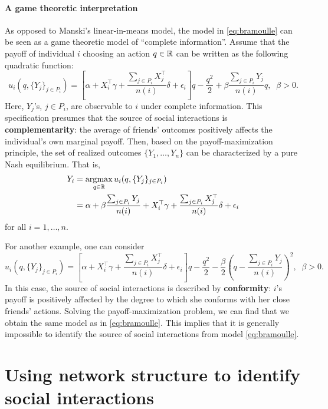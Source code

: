 \documentclass[11pt, A4paper, openany, uplatex]{book}
\begin{document}
\paragraph{A game theoretic interpretation}

As opposed to Manski's linear-in-means model,  the model in \eqref{eq:bramoulle} can be seen as a game theoretic model of ``complete information''.
Assume that the payoff of individual $i$ choosing an action $q \in \mathbb{R}$ can be written as the following quadratic function:
\begin{equation*}
u_i(q, \{Y_j\}_{j \in P_i})=\left[ \alpha + X_i^\top \gamma +  \frac{\sum_{j \in P_i} X_j^\top}{n(i)} \delta + \epsilon_i  \right] q -\frac{q^{2}}{2} + \beta \frac{\sum_{j \in P_i} Y_j}{n(i)} q, \;\; \beta > 0.
\end{equation*}
Here, $Y_j$'s, $j \in P_i$, are observable to $i$ under complete information. 
This specification presumes that the source of social interactions is \textbf{complementarity}: the average of friends' outcomes positively affects the individual's own marginal payoff.
Then, based on the payoff-maximization principle, the set of realized outcomes $\{Y_1, \ldots, Y_n\}$ can be characterized by a pure Nash equilibrium.
That is, 
\begin{align*}
	Y_i 
	&= \operatorname*{\arg\!\max}_{q \in \mathbb{R}}u_i(q, \{Y_j\}_{j \in P_i}) \\
	&= \alpha + \beta \frac{\sum_{j \in P_i} Y_j}{n(i)} + X_i^\top \gamma +  \frac{\sum_{j \in P_i} X_j^\top}{n(i)} \delta + \epsilon_i
\end{align*}
for all $i = 1, \ldots, n$.

For another example, one can consider
\begin{equation*}
u_i(q, \{Y_j\}_{j \in P_i})=\left[ \alpha + X_i^\top \gamma +  \frac{\sum_{j \in P_i} X_j^\top}{n(i)} \delta + \epsilon_i  \right] q -\frac{q^{2}}{2} -\frac{\beta}{2} \left( q - \dfrac{\sum_{j \in P_i} Y_j}{n(i)} \right)^2, \;\; \beta > 0.
\end{equation*}
In this case, the source of social interactions is described by \textbf{conformity}: $i$'s payoff is positively affected by the degree to which she conforms with her close friends' actions. 
Solving the payoff-maximization problem, we can find that we obtain the same model as in \eqref{eq:bramoulle}.
This implies that it is generally impossible to identify the source of social interactions from model \eqref{eq:bramoulle}. 

\section{Using network structure to identify social interactions}
\end{document}
